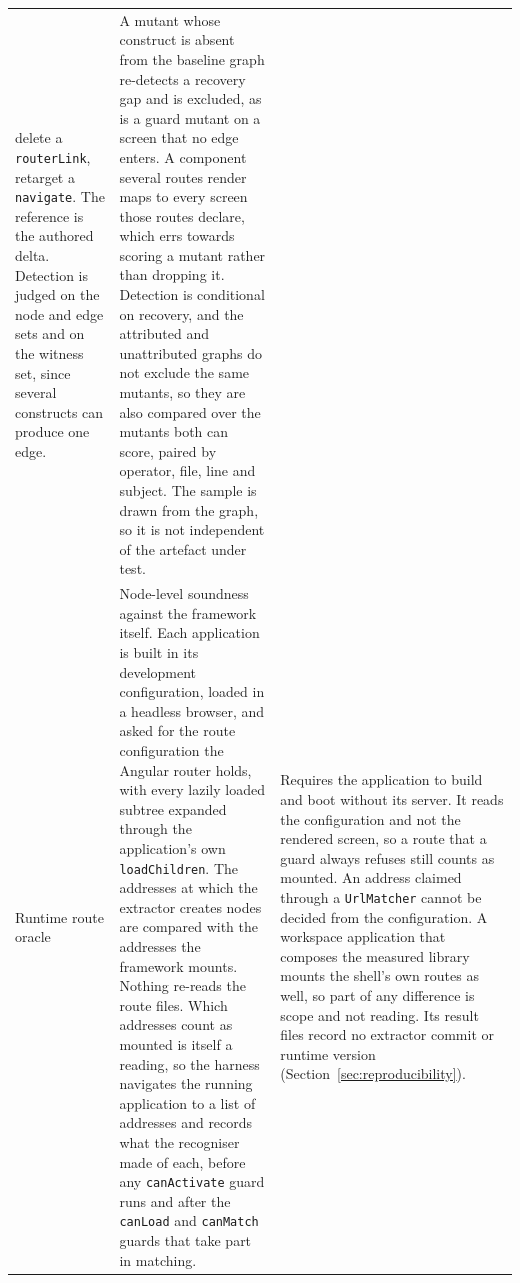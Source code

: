 \begin{xltabular}{\textwidth}{@{}lYY@{}}
delete a \texttt{routerLink}, retarget a \texttt{navigate}. The reference is the
authored delta. Detection is judged on the node and edge sets and on the witness set,
since several constructs can produce one edge. &
A mutant whose construct is absent from the baseline graph re-detects a recovery gap and
is excluded, as is a guard mutant on a screen that no edge enters. A component several routes render maps to every screen those routes declare, which errs towards scoring a mutant rather than dropping it. Detection is conditional on
recovery, and the attributed and unattributed graphs do not exclude the same mutants, so they are
also compared over the mutants both can score, paired by operator, file, line and subject. The
sample is drawn from the graph, so it is not independent of the artefact under test. \\
\addlinespace
Runtime route oracle & Node-level soundness against the framework itself. Each application is built in
its development configuration, loaded in a headless browser, and asked for the route configuration the
Angular router holds, with every lazily loaded subtree expanded through the application's own
\texttt{loadChildren}. The addresses at which the extractor creates nodes are compared with the addresses the framework
mounts. Nothing re-reads the route files. Which addresses count as mounted is itself a reading, so the
harness navigates the running application to a list of addresses and records what the recogniser made
of each, before any \texttt{canActivate} guard runs and after the \texttt{canLoad} and
\texttt{canMatch} guards that take part in matching. &
Requires the application to build and boot without its server. It reads the configuration and not the
rendered screen, so a route that a guard always refuses still counts as mounted. An address claimed
through a \texttt{UrlMatcher} cannot be decided from the configuration. A workspace application
that composes the measured library mounts the shell's own routes as well, so part of any difference
is scope and not reading. Its result files record no extractor commit or runtime version
(Section~\ref{sec:reproducibility}). \\
\end{xltabular}
\endgroup

